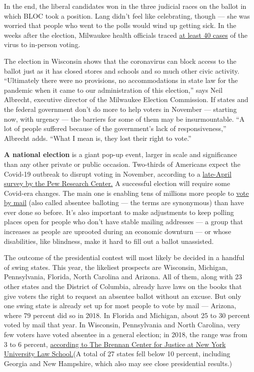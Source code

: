 In the end, the liberal candidates won in the three judicial races on
the ballot in which BLOC took a position. Lang didn't feel like
celebrating, though --- she was worried that people who went to the
polls would wind up getting sick. In the weeks after the election,
Milwaukee health officials traced
\href{https://www.wuwm.com/post/40-coronavirus-cases-milwaukee-county-linked-wisconsin-election-health-official-says\#stream/0}{at
least 40 cases} of the virus to in-person voting.

The election in Wisconsin shows that the coronavirus can block access to
the ballot just as it has closed stores and schools and so much other
civic activity. ``Ultimately there were no provisions, no accommodations
in state law for the pandemic when it came to our administration of this
election,'' says Neil Albrecht, executive director of the Milwaukee
Election Commission. If states and the federal government don't do more
to help voters in November --- starting now, with urgency --- the
barriers for some of them may be insurmountable. ``A lot of people
suffered because of the government's lack of responsiveness,'' Albrecht
adds. ``What I mean is, they lost their right to vote.''

\textbf{A national election} is a giant pop-up event, larger in scale
and significance than any other private or public occasion. Two-thirds
of Americans expect the Covid-19 outbreak to disrupt voting in November,
according to a
\href{https://www.people-press.org/2020/04/28/two-thirds-of-americans-expect-presidential-election-will-be-disrupted-by-covid-19/}{late-April
survey by the Pew Research Center.} A successful election will require
some Covid-era changes. The main one is enabling tens of millions more
people to
\href{https://www.nytimes3xbfgragh.onion/2020/05/25/us/vote-by-mail-coronavirus.html}{vote
by mail} (also called absentee balloting --- the terms are synonymous)
than have ever done so before. It's also important to make adjustments
to keep polling places open for people who don't have stable mailing
addresses --- a group that increases as people are uprooted during an
economic downturn --- or whose disabilities, like blindness, make it
hard to fill out a ballot unassisted.

The outcome of the presidential contest will most likely be decided in a
handful of swing states. This year, the likeliest prospects are
Wisconsin, Michigan, Pennsylvania, Florida, North Carolina and Arizona.
All of them, along with 23 other states and the District of Columbia,
already have laws on the books that give voters the right to request an
absentee ballot without an excuse. But only one swing state is already
set up for most people to vote by mail --- Arizona, where 79 percent did
so in 2018. In Florida and Michigan, about 25 to 30 percent voted by
mail that year. In Wisconsin, Pennsylvania and North Carolina, very few
voters have voted absentee in a general election; in 2018, the range was
from 3 to 6 percent,
\href{https://www.brennancenter.org/our-work/research-reports/preparing-your-state-election-under-pandemic-conditions}{according
to The Brennan Center for Justice at New York University Law School.}(A
total of 27 states fell below 10 percent, including Georgia and New
Hampshire, which also may see close presidential results.)

